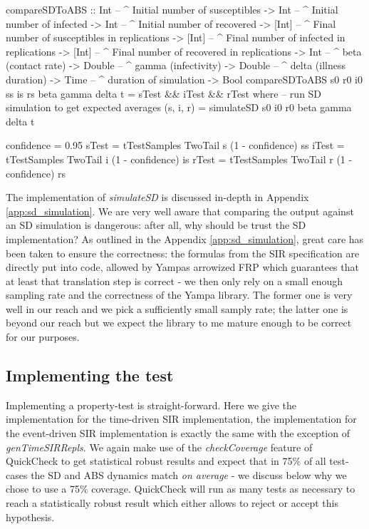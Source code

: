 \begin{HaskellCode}
compareSDToABS :: Int    -- ^ Initial number of susceptibles
               -> Int    -- ^ Initial number of infected
               -> Int    -- ^ Initial number of recovered
               -> [Int]  -- ^ Final number of susceptibles in replications
               -> [Int]  -- ^ Final number of infected in replications
               -> [Int]  -- ^ Final number of recovered in replications
               -> Int    -- ^ beta (contact rate)
               -> Double -- ^ gamma (infectivity)
               -> Double -- ^ delta (illness duration)
               -> Time   -- ^ duration of simulation
               -> Bool
compareSDToABS s0 r0 i0
               ss is rs
               beta gamma delta t = sTest && iTest && rTest
  where
    -- run SD simulation to get expected averages
    (s, i, r) = simulateSD s0 i0 r0 beta gamma delta t
    
    confidence = 0.95
    sTest = tTestSamples TwoTail s (1 - confidence) ss
    iTest = tTestSamples TwoTail i (1 - confidence) is
    rTest = tTestSamples TwoTail r (1 - confidence) rs
\end{HaskellCode}

The implementation of \textit{simulateSD} is discussed in-depth in Appendix \ref{app:sd_simulation}. We are very well aware that comparing the output against an SD simulation is dangerous: after all, why should be trust the SD implementation? As outlined in the Appendix \ref{app:sd_simulation}, great care has been taken to ensure the correctness: the formulas from the SIR specification are directly put into code, allowed by Yampas arrowized FRP which guarantees that at least that translation step is correct - we then only rely on a small enough sampling rate and the correctness of the Yampa library. The former one is very well in our reach and we pick a sufficiently small samply rate; the latter one is beyond our reach but we expect the library to me mature enough to be correct for our purposes.

\subsection{Implementing the test}
Implementing a property-test is straight-forward. Here we give the implementation for the time-driven SIR implementation, the implementation for the event-driven SIR implementation is exactly the same with the exception of \textit{genTimeSIRRepls}. We again make use of the \textit{checkCoverage} feature of QuickCheck to get statistical robust results and expect that in 75\% of all test-cases the SD and ABS dynamics match \textit{on average} - we discuss below why we chose to use a 75\% coverage. QuickCheck will run as many tests as necessary to reach a statistically robust result which either allows to reject or accept this hypothesis.

